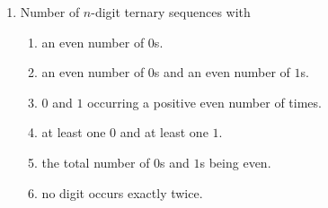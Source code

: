 \documentclass[svgnames]{amsart}
\begin{document}
\begin{enumerate}[leftmargin=*]
\item Number of $n$-digit ternary sequences with
\begin{enumerate}[label=(\roman*)]
	\item an even number of $0$s.
	\item an even number of $0$s and an even number of $1$s.
	\item $0$ and $1$ occurring a positive even number of times.
	\item at least one $0$ and at least one $1$.
	\item the total number of $0$s and $1$s being even.
	\item no digit occurs exactly twice.
\end{enumerate}
\end{enumerate}
\end{document}
